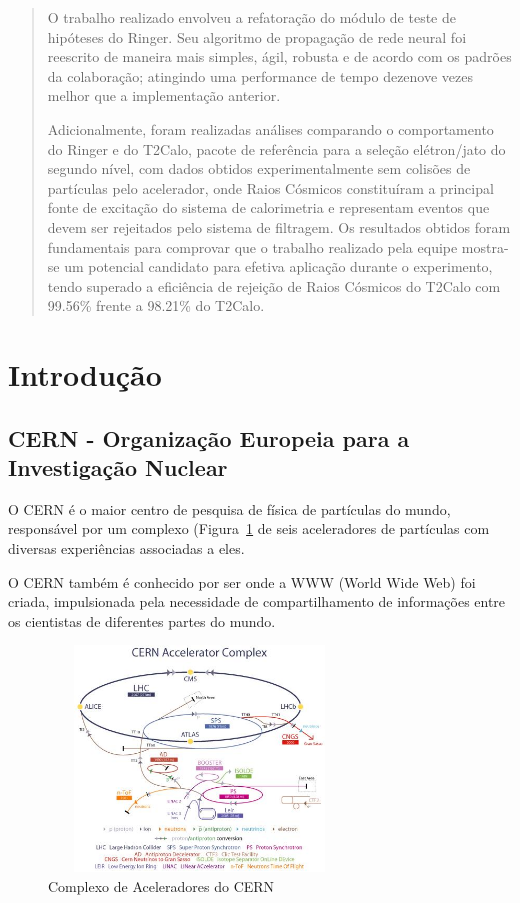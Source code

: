 \documentclass[a4paper,10pt,titlepage]{article}
\begin{document}
\begin{abstract}
O trabalho realizado envolveu a refatoração do módulo de teste de hipóteses do Ringer.
Seu algoritmo de propagação de rede neural foi reescrito de maneira mais simples, ágil, robusta e de acordo com os padrões da colaboração; atingindo uma performance de tempo dezenove vezes melhor que a implementação anterior.

Adicionalmente, foram realizadas análises comparando o comportamento do Ringer e do T2Calo, pacote de referência para a seleção elétron/jato do segundo nível, com dados obtidos experimentalmente sem colisões de partículas pelo acelerador, onde Raios Cósmicos constituíram a principal fonte de excitação do sistema de calorimetria e representam eventos que devem ser rejeitados pelo sistema de filtragem.
Os resultados obtidos foram fundamentais para comprovar que o trabalho realizado pela equipe mostra-se um potencial candidato para efetiva aplicação durante o experimento, tendo superado a eficiência de rejeição de Raios Cósmicos do T2Calo com 99.56\% frente a 98.21\% do T2Calo.

\end{abstract}

\section{Introdução}

\subsection{CERN - Organização Europeia para a Investigação Nuclear}

O CERN é o maior centro de pesquisa de física de partículas do mundo, responsável por um complexo (Figura~\ref{fig:cern_acelerators} de seis aceleradores de partículas com diversas experiências associadas a eles.

O CERN também é conhecido por ser onde a WWW (World Wide Web) foi criada, impulsionada pela necessidade de compartilhamento de informações entre os cientistas de diferentes partes do mundo.

\begin{figure}[htbp!]
 \centering
 \includegraphics[width=8cm,height=6cm]{Figs/atlas/cern_acelerators.jpeg}
 \caption{Complexo de Aceleradores do CERN}
 \label{fig:cern_acelerators}
\end{figure}
\end{document}
